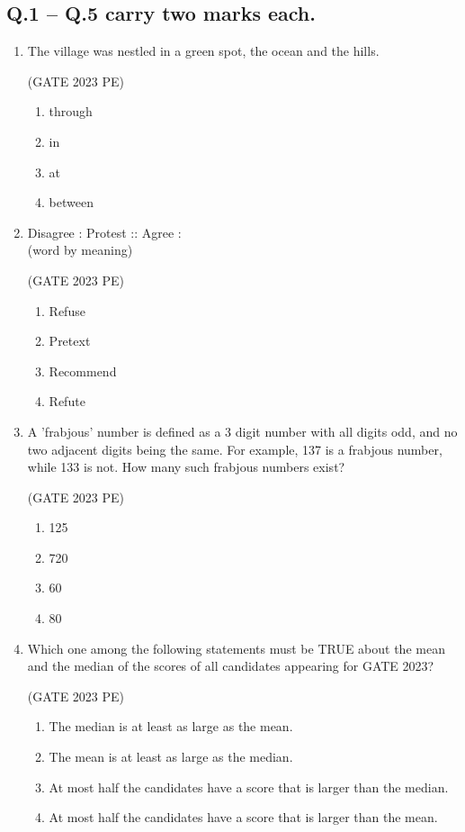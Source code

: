 \documentclass[journal,12pt,onecolumn]{exam}
\theoremstyle{remark}
\begin{document}
\subsection*{Q.1 -- Q.5 carry two marks each.}
\begin{enumerate}
    \item The village was nestled in a green spot,  the ocean and the hills.

    \hfill{(GATE 2023 PE)}\\
\begin{enumerate}
    \item through
    \item in
    \item at
    \item between
\end{enumerate}
\item Disagree : Protest :: Agree :  \\
(word by meaning)

\hfill{(GATE 2023 PE)}\\
\begin{enumerate}
    \item Refuse
    \item Pretext
    \item Recommend
    \item Refute
\end{enumerate}
\item A 'frabjous' number is defined as a 3 digit number with all digits odd, and no two
adjacent digits being the same. For example, 137 is a frabjous number, while 133 is
not. How many such frabjous numbers exist?

\hfill{(GATE 2023 PE)}\\
\begin{enumerate}
    \item 125
    \item 720
    \item 60
    \item 80
\end{enumerate}
\item Which one among the following statements must be TRUE about the mean and the
median of the scores of all candidates appearing for GATE 2023?

\hfill{(GATE 2023 PE)}\\
\begin{enumerate}
    \item The median is at least as large as the mean.
    \item The mean is at least as large as the median.
    \item At most half the candidates have a score that is larger than the median.
    \item At most half the candidates have a score that is larger than the mean.
\end{enumerate}


\end{enumerate}
\end{document}
